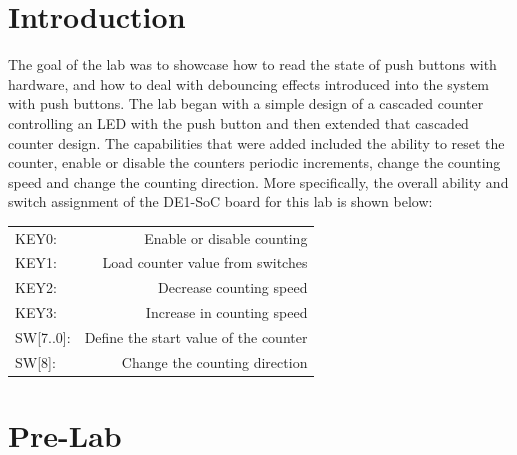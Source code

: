 \documentclass[
	letterpaper, %
	10pt, %
]{CSUniSchoolLabReport}
\begin{document}
\section{Introduction}

\hspace{.5 in} The goal of the lab was to showcase how to read the state of push buttons with hardware, and how to deal with debouncing effects introduced into the system with push buttons. The lab began with a simple design of a cascaded counter controlling an LED with the push button and then extended that cascaded counter design. The capabilities that were added included the ability to reset the counter, enable or disable the counters periodic increments, change the counting speed and change the counting direction. More specifically, the overall ability and switch assignment of the DE1-SoC board for this lab is shown below: \\

\begin{center}
\begin{tabular}[h!]{l r}
    KEY0: & Enable or disable counting \\
	KEY1: & Load counter value from switches\\
	KEY2: & Decrease counting speed \\
	KEY3: & Increase in counting speed\\
	SW[7..0]: &	Define the start value of the counter \\
	SW[8]: & Change the counting direction \\
\end{tabular}
\end{center}

\section{Pre-Lab}
\end{document}
